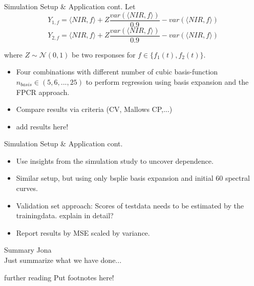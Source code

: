 \documentclass{beamer}
\begin{document}
	
	\begin{frame}{Simulation Setup \& Application cont.}
		Let 
		$$Y_{1,f} = \langle NIR, f\rangle + Z  \frac{var(\langle NIR, f\rangle)}{0.9} - var(\langle NIR, f\rangle)$$ 
		$$Y_{2,f} = \langle NIR, f\rangle + Z  \frac{var(\langle NIR, f\rangle)}{0.9} - var(\langle NIR, f\rangle)$$
		
		where $Z \sim \mathcal{N}(0,1)$ be two responses for $f \in \{f_1(t), f_2(t)\}$.	
		\begin{itemize}
    		\item Four combinations with different number of cubic basis-function $n_{basis} \in (5,6,...,25)$ to perform regression using basis expansion and the FPCR approach.
			\item Compare results via criteria (CV, Mallows CP,...)
			\item {\color{green} add results here!}
		\end{itemize}
	\end{frame}
	
	
	\begin{frame}{Simulation Setup \& Application cont.}
		\begin{itemize}
		\item
    		Use insights from the simulation study to uncover dependence.
    		\item
    		Similar setup, but using only bsplie basis expansion and initial 60 spectral curves.
    		\item
    		Validation set approach:	Scores of testdata needs to be estimated by the trainingdata.  {\color{green} explain in detail?}
    		\item
    		Report results by MSE scaled by variance.
		\end{itemize}
	\end{frame}
	
	

	\begin{frame}{Summary}
		Jona \\
		Just summarize what we have done...
	\end{frame}

	\begin{frame}{further reading}
		Put footnotes here!
	\end{frame}
	
\end{document}
